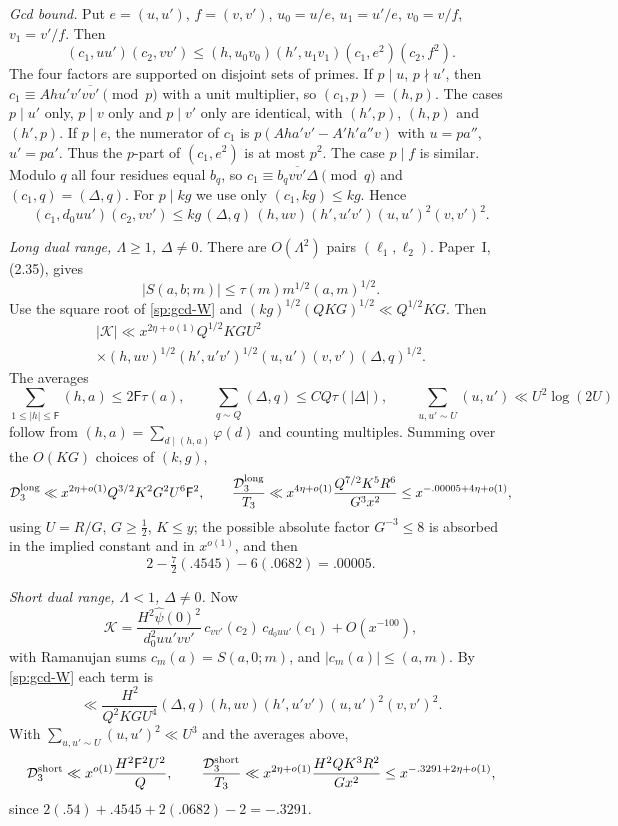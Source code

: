 \emph{Gcd bound.} Put $e=(u,u')$, $f=(v,v')$, $u_0=u/e$, $u_1=u'/e$,
$v_0=v/f$, $v_1=v'/f$. Then
\begin{equation}\label{sp:gcd-local}
 (c_1,uu')(c_2,vv')\le(h,u_0v_0)(h',u_1v_1)(c_1,e^2)(c_2,f^2).
\end{equation}
The four factors are supported on disjoint sets of primes. If $p\mid u$,
$p\nmid u'$, then $c_1\equiv Ahu'v'\overline{vv'}\pmod p$ with a unit
multiplier, so $(c_1,p)=(h,p)$. The cases $p\mid u'$ only, $p\mid v$ only and
$p\mid v'$ only are identical, with $(h',p)$, $(h,p)$ and $(h',p)$. If
$p\mid e$, the numerator of $c_1$ is $p(Aha'v'-A'h'a''v)$ with $u=pa''$,
$u'=pa'$. Thus the $p$-part of $(c_1,e^2)$ is at most $p^2$. The case
$p\mid f$ is similar. Modulo $q$ all four residues equal $b_q$, so
$c_1\equiv b_q\overline{vv'}\Delta\pmod q$ and $(c_1,q)=(\Delta,q)$. For
$p\mid kg$ we use only $(c_1,kg)\le kg$. Hence
\begin{equation}\label{sp:gcd-W}
 (c_1,d_0uu')(c_2,vv')\le kg\,(\Delta,q)\,(h,uv)(h',u'v')(u,u')^2(v,v')^2 .
\end{equation}

\emph{Long dual range, $\Lambda\ge1$, $\Delta\ne0$.} There are $O(\Lambda^2)$
pairs $(\ell_1,\ell_2)$. Paper~I, (2.35), gives
\[
 |S(a,b;m)|\le\tau(m)m^{1/2}(a,m)^{1/2}.
\]
Use the square root of \eqref{sp:gcd-W} and
$(kg)^{1/2}(QKG)^{1/2}\ll Q^{1/2}KG$. Then
\[
\begin{multlined}
 |\mathcal K|\ll x^{2\eta+o(1)}Q^{1/2}KGU^2\\
 \times(h,uv)^{1/2}(h',u'v')^{1/2}(u,u')(v,v')(\Delta,q)^{1/2}.
\end{multlined}
\]
The averages
\[
 \sum_{1\le|h|\le\mathsf F}(h,a)\le2\mathsf F\tau(a),\qquad
 \sum_{q\sim Q}(\Delta,q)\le CQ\tau(|\Delta|),\qquad
 \sum_{u,u'\sim U}(u,u')\ll U^2\log(2U)
\]
follow from $(h,a)=\sum_{d\mid(h,a)}\varphi(d)$ and counting multiples.
Summing over the $O(KG)$ choices of $(k,g)$,
\[
 \mathcal D_3^{\rm long}\ll x^{2\eta+o(1)}Q^{3/2}K^2G^2U^6\mathsf F^2,\qquad
 \frac{\mathcal D_3^{\rm long}}{T_3}\ll x^{4\eta+o(1)}\frac{Q^{7/2}K^5R^6}{G^3x^2}
 \le x^{-.00005+4\eta+o(1)},
\]
using $U=R/G$, $G\ge\tfrac12$, $K\le y$; the possible absolute factor
$G^{-3}\le8$ is absorbed in the implied constant and in $x^{o(1)}$, and
then
\[
 2-\tfrac72(.4545)-6(.0682)=.00005 .
\]

\emph{Short dual range, $\Lambda<1$, $\Delta\ne0$.} Now
\[
 \mathcal K=\frac{H^2\hat\psi(0)^2}{d_0^2uu'vv'}\,c_{vv'}(c_2)\,c_{d_0uu'}(c_1)+O(x^{-100}),
\]
with Ramanujan sums $c_m(a)=S(a,0;m)$, and $|c_m(a)|\le(a,m)$. By
\eqref{sp:gcd-W} each term is
\[
 \ll\frac{H^2}{Q^2KGU^4}(\Delta,q)(h,uv)(h',u'v')(u,u')^2(v,v')^2 .
\]
With $\sum_{u,u'\sim U}(u,u')^2\ll U^3$ and the averages above,
\[
 \mathcal D_3^{\rm short}\ll x^{o(1)}\frac{H^2\mathsf F^2U^2}Q,\qquad
 \frac{\mathcal D_3^{\rm short}}{T_3}\ll x^{2\eta+o(1)}\frac{H^2QK^3R^2}{Gx^2}
 \le x^{-.3291+2\eta+o(1)},
\]
since $2(.54)+.4545+2(.0682)-2=-.3291$.

